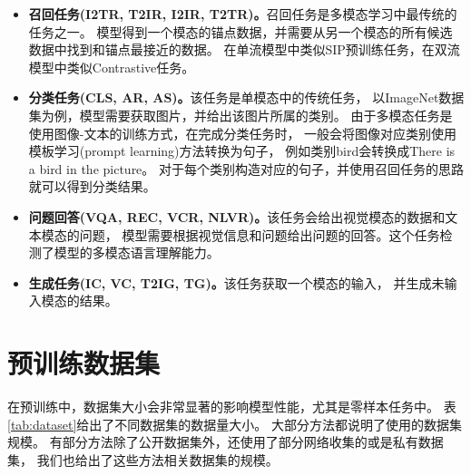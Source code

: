 \begin{itemize}
    \item \textbf{召回任务(I2TR, T2IR, I2IR, T2TR)。}召回任务是多模态学习中最传统的任务之一。
    模型得到一个模态的锚点数据，并需要从另一个模态的所有候选数据中找到和锚点最接近的数据。
    在单流模型中类似SIP预训练任务，在双流模型中类似Contrastive任务。
    
    \item \textbf{分类任务(CLS, AR, AS)。}该任务是单模态中的传统任务，
    以ImageNet数据集为例，模型需要获取图片，并给出该图片所属的类别。
    由于多模态任务是使用图像-文本的训练方式，在完成分类任务时，
    一般会将图像对应类别使用模板学习(prompt learning)方法转换为句子，
    例如类别bird会转换成There is a bird in the picture。
    对于每个类别构造对应的句子，并使用召回任务的思路就可以得到分类结果。
    
    \item \textbf{问题回答(VQA, REC, VCR, NLVR)。}该任务会给出视觉模态的数据和文本模态的问题，
    模型需要根据视觉信息和问题给出问题的回答。这个任务检测了模型的多模态语言理解能力。
    
    \item \textbf{生成任务(IC, VC, T2IG, TG)。}该任务获取一个模态的输入，
    并生成未输入模态的结果。
\end{itemize}

\section{预训练数据集}\label{sec:dataset}

在预训练中，数据集大小会非常显著的影响模型性能，尤其是零样本任务中\cite{align}。
表\ref{tab:dataset}给出了不同数据集的数据量大小。
大部分方法都说明了使用的数据集规模。
有部分方法除了公开数据集外，还使用了部分网络收集的或是私有数据集，
我们也给出了这些方法相关数据集的规模。

